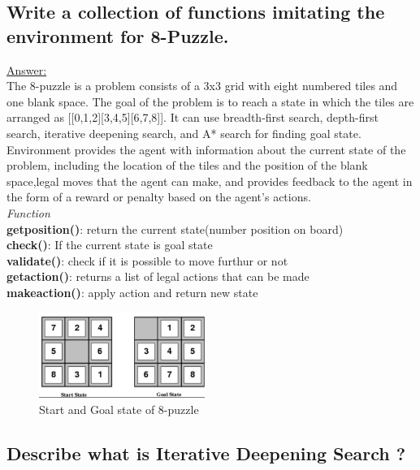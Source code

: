 \documentclass[15pt,journal]{IEEEtran}
\begin{document}
\subsection{Write a collection of functions imitating the environment for 8-Puzzle.}

\underline{Answer:}\\
The \cite{uninformed}8-puzzle is a problem consists of a 3x3 grid with eight numbered tiles and one blank space. The goal of the problem is to reach a state in which the tiles are arranged as  [[0,1,2][3,4,5][6,7,8]].
It can use  breadth-first search, depth-first search, iterative deepening search, and A* search for finding goal state.\\
Environment provides the agent with information about the current state of the problem, including the location of the tiles and the position of the blank space,legal moves that the agent can make, and provides feedback to the agent in the form of a reward or penalty based on the agent's actions.\\ 
\emph{Function}\\
{\bf{getposition()}}: return the current state(number position on board) \\
{\bf{check()}}: If the current state is goal state\\
{\bf{validate()}}: check if it is possible to move furthur or not\\
{\bf{getaction()}}: returns a list of legal actions that can be made\\
{\bf{makeaction()}}: apply action and return new state 

\begin{figure}[H]%
\begin {center}
\includegraphics[width=0.48\textwidth]{image/8puzzle.jpeg}
\caption{Start and Goal state of 8-puzzle} 
\label{fig:ecg}
\end {center}
\end{figure}


\subsection{Describe what is Iterative Deepening Search ?}
\end{document}
